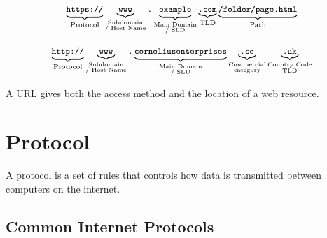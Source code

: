 \begin{infobox}

\[
\small
\underbrace{\text{\texttt{https://}}}_{\text{Protocol}}
\underbrace{\text{\texttt{www}}}_{\substack{\text{Subdomain}\\\text{/ Host Name}}}
\text{\texttt{.}}
\underbrace{\text{\texttt{example}}}_{\substack{\text{Main Domain}\\\text{/ SLD}}}
\underbrace{\text{\texttt{.com}}}_{\text{TLD}}
\underbrace{\text{\texttt{/folder/page.html}}}_{\text{Path}}
\]

\[
\small
\underbrace{\text{\texttt{http://}}}_{\text{Protocol}}
\underbrace{\text{\texttt{www}}}_{\substack{\text{Subdomain}\\\text{/ Host Name}}}
\text{\texttt{.}}
\underbrace{\text{\texttt{corneliusenterprises}}}_{\substack{\text{Main Domain}\\\text{/ SLD}}}
\underbrace{\text{\texttt{.co}}}_{\substack{\text{Commercial}\\\text{category}}}
\underbrace{\text{\texttt{.uk}}}_{\substack{\text{Country Code}\\\text{TLD}}}
\]

\end{infobox}

\begin{summarybox}
A URL gives both the access method and the location of a web resource.
\end{summarybox}

\section{Protocol}

\begin{definitionbox}[Protocol]
A protocol is a set of rules that controls how data is transmitted between computers on the internet.
\end{definitionbox}

\subsection{Common Internet Protocols}


